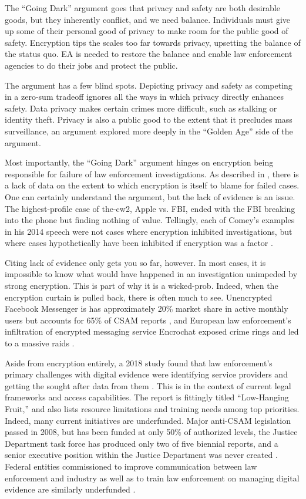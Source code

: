 The ``Going Dark'' argument goes that privacy and safety are both desirable goods, but they inherently conflict, and we
need balance. Individuals must give up some of their personal good of privacy to make room for the public good of
safety. Encryption tips the scales too far towards privacy, upsetting the balance of the status quo. \ac{EA} is needed
to restore the balance and enable law enforcement agencies to do their jobs and protect the public.

The argument has a few blind spots. Depicting privacy and safety as competing in a zero-sum tradeoff ignores all the
ways in which privacy directly enhances safety. Data privacy makes certain crimes more difficult, such as stalking or
identity theft. Privacy is also a public good to the extent that it precludes mass surveillance, an argument explored
more deeply in the ``Golden Age'' side of the argument.

Most importantly, the ``Going Dark'' argument hinges on encryption being responsible for failure of law enforcement
investigations. As described in , there is a lack of data on the extent to which encryption is
itself to blame for failed cases. One can certainly understand the argument, but the lack of evidence is an issue. The
highest-profile case of \ac{the-cw2}, Apple vs. FBI, ended with the \ac{FBI} breaking into the phone but finding nothing
of value. Tellingly, each of Comey's examples in his 2014 speech were not cases where encryption inhibited
investigations, but where cases hypothetically  have been inhibited if encryption was a factor
\cite{comey_2014}.

Citing lack of evidence only gets you so far, however. In most cases, it is impossible to know what would have happened
in an investigation unimpeded by strong encryption. This is part of why it is a \ac{wicked-prob}. Indeed, when the
encryption curtain is pulled back, there is often much to see. Unencrypted Facebook Messenger is has approximately 20\%
market share in active monthly users \cite{statista_2020} but accounts for 65\% of \ac{CSAM} reports
\cite{keller_internet_2019}, and European law enforcement's infiltration of encrypted messaging service Encrochat
exposed crime rings and led to a massive raids \cite{cox_2020}.

Aside from encryption entirely, a 2018 study found that law enforcement's primary challenges with digital evidence were
identifying service providers and getting the sought after data from them \cite{carter_2018}. This is in the context of
current legal frameworks and access capabilities. The report is fittingly titled ``Low-Hanging Fruit,'' and also lists
resource limitations and training needs among top priorities. Indeed, many current initiatives are underfunded. Major
anti-\ac{CSAM} legislation passed in 2008, but has been funded at only 50\% of authorized levels, the Justice Department
task force has produced only two of five biennial reports, and a senior executive position within the Justice Department
was never created \cite{keller_internet_2019}. Federal entities commissioned to improve communication between law
enforcement and industry as well as to train law enforcement on managing digital evidence are similarly underfunded
\cite{carter_2018}.

